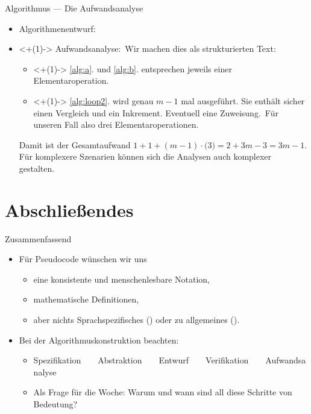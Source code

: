 \begin{frame}{Algorithmus --- Die Aufwandsanalyse}
\begin{itemize}[]
    \item Algorithmenentwurf: \\
    \usebox\algobox
    \item<+(1)-> Aufwandsanalyse:\pause\ Wir machen dies als strukturierten Text: \begin{itemize}
        \item<+(1)-> \ref{alg:a}. und \ref{alg:b}. entsprechen jeweils einer Elementaroperation.
        \item<+(1)-> \ref{alg:loop2}. wird genau \(m - 1\) mal ausgeführt. Sie enthält sicher einen Vergleich und ein Inkrement. Eventuell eine Zuweisung.\pause\ Für unseren Fall also drei Elementaroperationen.
    \end{itemize}
        \pause Damit ist der Gesamtaufwand \(1 + 1 + (m - 1) \cdot \bigl( 3 \bigr) = 2 + 3m - 3 = 3m - 1\).\medskip\\
        \pause Für komplexere Szenarien können sich die Analysen auch komplexer gestalten.
\end{itemize}
\end{frame}
\fi

\section{Abschließendes}
{\SummaryFrame
\begin{frame}[t]{Zusammenfassend}
\pause \printBibCommand
\vfill\vfill %
\begin{itemize}[<+(1)->]
    \itemsep16pt
    \item Für Pseudocode wünschen wir uns \begin{itemize}
        \item eine konsistente und menschenlesbare Notation,
        \item mathematische Definitionen,
        \item aber nichts Sprachspezifisches () oder zu allgemeines ().
    \end{itemize}
    \item Bei der Algorithmuskonstruktion beachten: \begin{itemize}
        \item \def\t{~~\faAngleRight~~}Spezifikation\t Abstraktion\t Entwurf\t Verifikation\t Aufwandsanalyse
        \item Als Frage für die Woche: Warum und wann sind all diese Schritte von Bedeutung?
    \end{itemize}
\end{itemize}
\end{frame}
}


\iffull\fi
